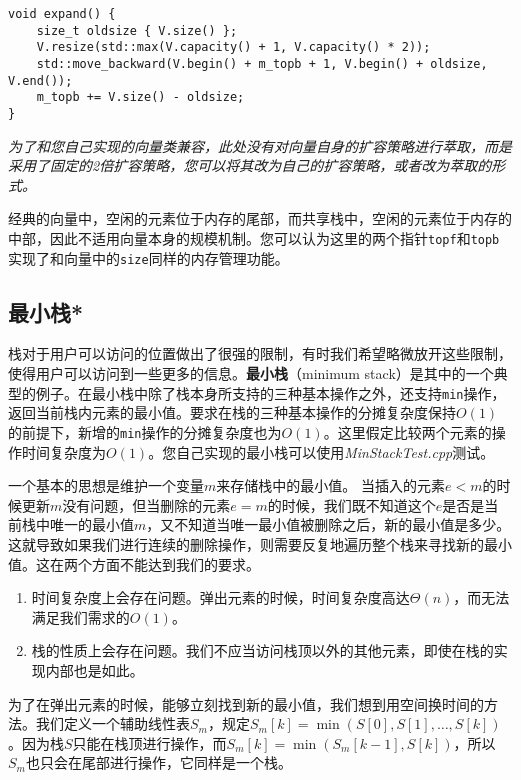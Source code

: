 \begin{lstlisting}
void expand() {
    size_t oldsize { V.size() };
    V.resize(std::max(V.capacity() + 1, V.capacity() * 2));
    std::move_backward(V.begin() + m_topb + 1, V.begin() + oldsize, V.end());
    m_topb += V.size() - oldsize;
}
\end{lstlisting}

\textit{为了和您自己实现的向量类兼容，此处没有对向量自身的扩容策略进行萃取，而是采用了固定的2倍扩容策略，您可以将其改为自己的扩容策略，或者改为萃取的形式。}

经典的向量中，空闲的元素位于内存的尾部，而共享栈中，空闲的元素位于内存的中部，因此不适用向量本身的规模机制。您可以认为这里的两个指针\lstinline{topf}和\lstinline{topb}实现了和向量中的\lstinline{size}同样的内存管理功能。

\subsection{最小栈*}
\label{sta:最小栈}
栈对于用户可以访问的位置做出了很强的限制，有时我们希望略微放开这些限制，使得用户可以访问到一些更多的信息。\textbf{最小栈}（minimum stack）是其中的一个典型的例子。在最小栈中除了栈本身所支持的三种基本操作之外，还支持\lstinline{min}操作，返回当前栈内元素的最小值。要求在栈的三种基本操作的分摊复杂度保持$O(1)$的前提下，新增的\lstinline{min}操作的分摊复杂度也为$O(1)$。这里假定比较两个元素的操作时间复杂度为$O(1)$。您自己实现的最小栈可以使用\textit{MinStackTest.cpp}测试。

一个基本的思想是维护一个变量$m$来存储栈中的最小值。
当插入的元素$e<m$的时候更新$m$没有问题，但当删除的元素$e=m$的时候，我们既不知道这个$e$是否是当前栈中唯一的最小值$m$，又不知道当唯一最小值被删除之后，新的最小值是多少。这就导致如果我们进行连续的删除操作，则需要反复地遍历整个栈来寻找新的最小值。这在两个方面不能达到我们的要求。

\begin{enumerate}
    \item 时间复杂度上会存在问题。弹出元素的时候，时间复杂度高达$\Theta(n)$，而无法满足我们需求的$O(1)$。
    \item 栈的性质上会存在问题。我们不应当访问栈顶以外的其他元素，即使在栈的实现内部也是如此。
\end{enumerate}

为了在弹出元素的时候，能够立刻找到新的最小值，我们想到用空间换时间的方法。我们定义一个辅助线性表$S_m$，规定$S_m[k] = \min (S[0],S[1],\dots,S[k])$。因为栈$S$只能在栈顶进行操作，而$S_m[k] = \min(S_m[k-1],S[k])$，所以$S_m$也只会在尾部进行操作，它同样是一个栈。

